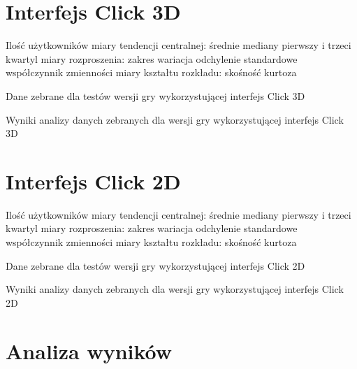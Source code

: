 \documentclass[a4paper,12pt,numbers=noenddot]{report}
\begin{document}
\section{Interfejs Click 3D}%
Ilość użytkowników
miary tendencji centralnej:
	średnie
	mediany
	pierwszy i trzeci kwartyl
miary rozproszenia:
	zakres
	wariacja
	odchylenie standardowe
	współczynnik zmienności
miary kształtu rozkładu:
	skośność
	kurtoza


\begin{table}
  \caption{Dane zebrane dla testów wersji gry wykorzystującej interfejs Click 3D}
  \resizebox{0.9\textwidth}{!}{%
	
  }
  \label{tab:results_Click3d}%
  \caption{Wyniki analizy danych zebranych dla wersji gry wykorzystującej interfejs Click 3D}
  \resizebox{0.9\textwidth}{!}{%
	
  }
  \label{tab:analysis_Click3d}%
\end{table}%

\section{Interfejs Click 2D}%
Ilość użytkowników
miary tendencji centralnej:
	średnie
	mediany
	pierwszy i trzeci kwartyl
miary rozproszenia:
	zakres
	wariacja
	odchylenie standardowe
	współczynnik zmienności
miary kształtu rozkładu:
	skośność
	kurtoza
\begin{table}
  \caption{Dane zebrane dla testów wersji gry wykorzystującej interfejs Click 2D}
  \resizebox{\textwidth}{!}{%
	
  }
  \label{tab:results_Click2d}%
  \caption{Wyniki analizy danych zebranych dla wersji gry wykorzystującej interfejs Click 2D}
  \resizebox{\textwidth}{!}{%
	
  }
  \label{tab:analysis_Click2d}%
\end{table}%

\section{Analiza wyników}
\end{document}
